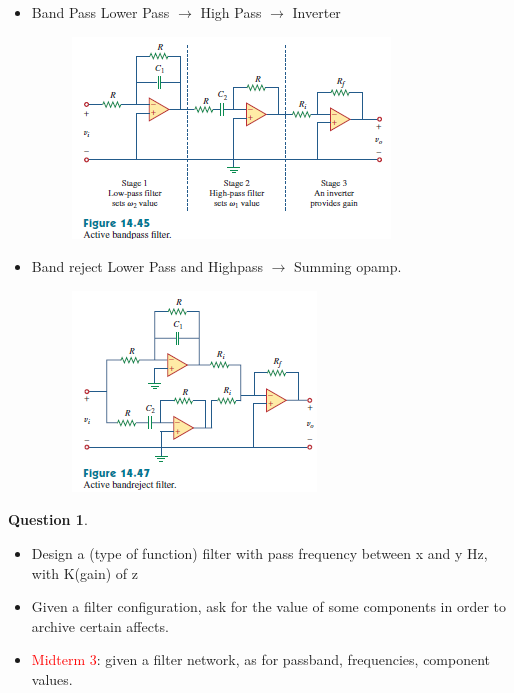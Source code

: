 \documentclass[10pt,landscape]{article}
\newcommand\todo[1]{\textcolor{red}{#1}}
\theoremstyle{definition}
\newtheorem*{question}{Question}
\theoremstyle{remark}
\begin{document}
\begin{multicols}{3}
\begin{itemize}[noitemsep,nolistsep]
    \item Band Pass
    Lower Pass $\rightarrow$ High Pass $\rightarrow$ Inverter
    \begin{figure}[H]
    \centering
    \includegraphics[width=0.8\linewidth]{202/figure/filter_active_bp.png}
    \caption{}
    \label{fig:filter_abp}
\end{figure}

    \item Band reject
    Lower Pass and Highpass $\rightarrow$ Summing opamp. 
    \begin{figure}[H]
    \centering
    \includegraphics[width=0.8\linewidth]{202/figure/filter_active_br.png}
    \caption{}
    \label{fig:filter_abr}
    \end{figure}
\end{itemize}

\begin{question}\mbox{} \\
\begin{itemize}[noitemsep,nolistsep]
    \item Design a (type of function) filter with pass frequency between x and y Hz, with K(gain) of z
    \item Given a filter configuration, ask for the value of some components in order to archive certain affects. 
    \item \todo{Midterm 3}: given a filter network, as for passband, frequencies, component values. 
\end{itemize}
\end{question}


\end{multicols}
\end{document}
